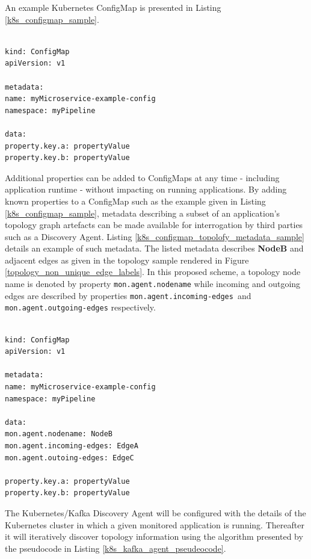 An example Kubernetes ConfigMap is presented in Listing \ref{k8s_configmap_sample}. 

\begin{lstlisting}[caption={Kubernetes ConfigMap sample},captionpos=b,label={k8s_configmap_sample}]

kind: ConfigMap
apiVersion: v1

metadata:
name: myMicroservice-example-config
namespace: myPipeline

data:
property.key.a: propertyValue
property.key.b: propertyValue

\end{lstlisting}

Additional properties can be added to ConfigMaps at any time - including application runtime - without impacting on running applications. By adding known properties to a ConfigMap such as the example given in Listing \ref{k8s_configmap_sample}, metadata describing a subset of an application's topology graph artefacts can be made available for interrogation by third parties such as a Discovery Agent. Listing \ref{k8s_configmap_topolofy_metadata_sample} details an example of such metadata. The listed metadata describes \textbf{NodeB} and adjacent edges as given in the topology sample rendered in Figure \ref{topology_non_unique_edge_labels}.  In this proposed scheme, a topology node name is denoted by property \texttt{mon.agent.nodename} while incoming and outgoing edges are described by properties \texttt{mon.agent.incoming-edges }and \texttt{mon.agent.outgoing-edges} respectively.

\vspace{5mm}

\begin{lstlisting}[caption={Kubernetes ConfigMap containing topology metadata},captionpos=b,label={k8s_configmap_topolofy_metadata_sample}]

kind: ConfigMap
apiVersion: v1

metadata:
name: myMicroservice-example-config
namespace: myPipeline

data:
mon.agent.nodename: NodeB
mon.agent.incoming-edges: EdgeA
mon.agent.outoing-edges: EdgeC

property.key.a: propertyValue
property.key.b: propertyValue

\end{lstlisting}

The Kubernetes/Kafka Discovery Agent will be configured with the details of the Kubernetes cluster in which a given monitored application is running. Thereafter it will iteratively discover topology information using the algorithm presented by the pseudocode in Listing \ref{k8s_kafka_agent_pseudeocode}.

